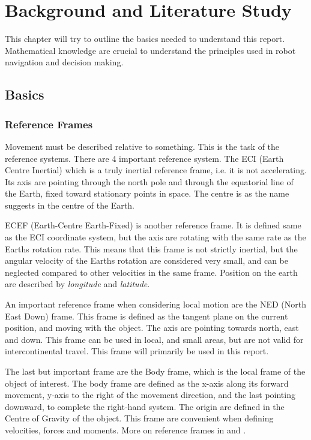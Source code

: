


\chapter{Background and Literature Study}
This chapter will try to outline the basics needed to understand this report. Mathematical
knowledge are crucial to understand the principles used in robot navigation and decision
making. 


\section{Basics}

\subsection{Reference Frames}
	Movement must be described relative to something. This is the task of the reference systems. There are
	4 important reference system. The ECI (Earth Centre Inertial) which is a truly inertial reference
	frame, i.e. it is not accelerating. Its axis are pointing through the north pole and through the
	equatorial line of the Earth, fixed toward stationary points in space. The centre is as the name
	suggests in the centre of the Earth. 
	
	ECEF (Earth-Centre Earth-Fixed) is another reference frame. It is defined same as the ECI coordinate
	system, but the axis are rotating with the same rate as the Earths rotation rate. This means that this frame
	is not
	strictly inertial, but the angular velocity of the Earths rotation are considered very small, and can
	be neglected compared to other velocities in the same frame. Position on the earth are described by
	\textit{longitude} and \textit{latitude}.

	An important reference frame when considering local motion are the NED (North East Down) frame. This
	frame is defined as the tangent plane on the current position, and moving with the object. The axis
	are pointing towards north, east and down. This frame can be used in local, and small areas, but are
	not valid for intercontinental travel. This frame will primarily be used in this report. 

	The last but important frame are the Body frame, which is the local frame of the object of interest.
	The body frame are defined as the x-axis along its forward movement, y-axis to the right of the
	movement direction, and the last pointing downward, to complete the right-hand system. The
	origin are defined in the Centre of Gravity of the object. This frame are convenient when
	defining velocities, forces and moments. More on reference frames in \cite{fossen} and
    \cite{forsell}.

